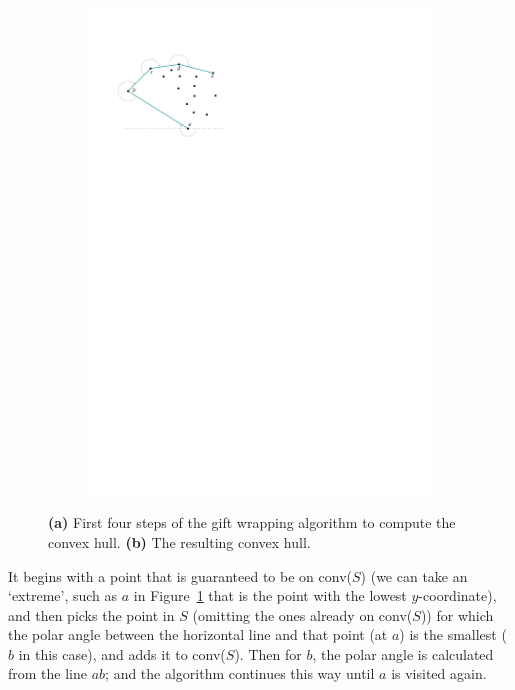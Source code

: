 \begin{figure}
\begin{subfigure}[b]{0.45\linewidth}
    \includegraphics[page=2,width=\textwidth]{figs/giftwrapping.pdf}
    \caption{}
  \end{subfigure}
  \caption{\textbf{(a)} First four steps of the gift wrapping algorithm to compute the convex hull. \textbf{(b)} The resulting convex hull.}
\label{fig:giftwrapping}
\end{figure}
It begins with a point that is guaranteed to be on conv($S$) (we can take an `extreme', such as $a$ in Figure~\ref{fig:giftwrapping} that is the point with the lowest $y$-coordinate), and then picks the point in $S$ (omitting the ones already on conv($S$)) for which the polar angle between the horizontal line and that point (at $a$) is the smallest ($b$ in this case), and adds it to conv($S$).
Then for $b$, the polar angle is calculated from the line $ab$; and the algorithm continues this way until $a$ is visited again.

